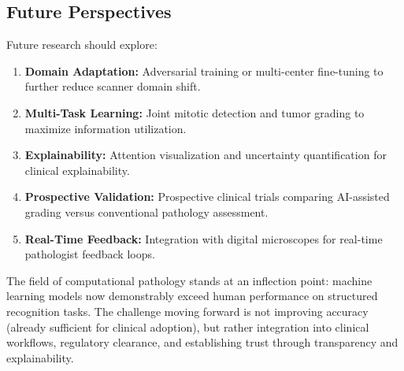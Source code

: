 \documentclass[journal]{IEEEtran}
\begin{document}
\subsection{Future Perspectives}
Future research should explore:
\begin{enumerate}
\item \textbf{Domain Adaptation:} Adversarial training or multi-center fine-tuning to further reduce scanner domain shift.
\item \textbf{Multi-Task Learning:} Joint mitotic detection and tumor grading to maximize information utilization.
\item \textbf{Explainability:} Attention visualization and uncertainty quantification for clinical explainability.
\item \textbf{Prospective Validation:} Prospective clinical trials comparing AI-assisted grading versus conventional pathology assessment.
\item \textbf{Real-Time Feedback:} Integration with digital microscopes for real-time pathologist feedback loops.
\end{enumerate}

The field of computational pathology stands at an inflection point: machine learning models now demonstrably exceed human performance on structured recognition tasks. The challenge moving forward is not improving accuracy (already sufficient for clinical adoption), but rather integration into clinical workflows, regulatory clearance, and establishing trust through transparency and explainability.
\end{document}
